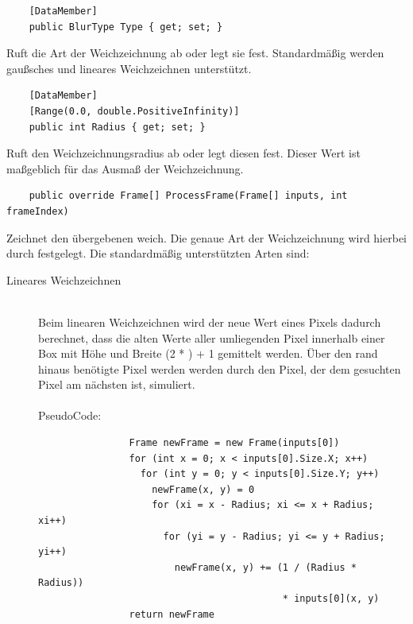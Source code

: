 \begin{itemize}

	\begin{verbatim}
	[DataMember]
	public BlurType Type { get; set; }
	\end{verbatim}
	Ruft die Art der Weichzeichnung ab oder legt sie fest. Standardmäßig werden gaußsches und lineares Weichzeichnen unterstützt.
	
	\begin{verbatim}
	[DataMember]
	[Range(0.0, double.PositiveInfinity)]
	public int Radius { get; set; }
	\end{verbatim}
	Ruft den Weichzeichnungsradius ab oder legt diesen fest. Dieser Wert ist maßgeblich für das Ausmaß der Weichzeichnung.

	\begin{verbatim}
	public override Frame[] ProcessFrame(Frame[] inputs, int frameIndex)
	\end{verbatim}
	Zeichnet den übergebenen  weich. Die genaue Art der Weichzeichnung wird hierbei durch  festgelegt. Die standardmäßig unterstützten Arten sind:
	\begin{description}
		\item[Lineares Weichzeichnen]~\\
			Beim linearen Weichzeichnen wird der neue Wert eines Pixels dadurch berechnet, dass die alten Werte aller umliegenden Pixel innerhalb einer Box mit Höhe und Breite (2 * ) + 1 gemittelt werden. Über den rand hinaus benötigte Pixel werden werden durch den Pixel, der dem gesuchten Pixel am nächsten ist, simuliert. ~\\~\\
			PseudoCode:
			\begin{verbatim}
				Frame newFrame = new Frame(inputs[0])
				for (int x = 0; x < inputs[0].Size.X; x++)
				  for (int y = 0; y < inputs[0].Size.Y; y++)
				    newFrame(x, y) = 0
				    for (xi = x - Radius; xi <= x + Radius; xi++)
				      for (yi = y - Radius; yi <= y + Radius; yi++)
				        newFrame(x, y) += (1 / (Radius * Radius))
				                           * inputs[0](x, y)
				return newFrame
				

\end{verbatim}
\end{description}
\end{itemize}
